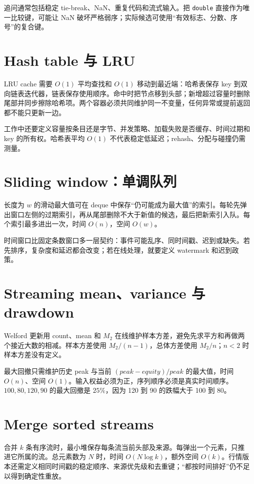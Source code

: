 追问通常包括稳定 tie-break、NaN、重复代码和流式输入。把 \texttt{double} 直接作为唯一比较键，可能让 NaN 破坏严格弱序；实际候选可使用“有效标志、分数、序号”的复合键。

\section{Hash table 与 LRU}

LRU cache 需要 \(O(1)\) 平均查找和 \(O(1)\) 移动到最近端：哈希表保存 key 到双向链表迭代器，链表保存使用顺序。命中时把节点移到头部；新增超过容量时删除尾部并同步擦除哈希项。两个容器必须共同维护同一不变量，任何异常或提前返回都不能只更新一边。

工作中还要定义容量按条目还是字节、并发策略、加载失败是否缓存、时间过期和 key 的所有权。哈希表平均 \(O(1)\) 不代表稳定低延迟；rehash、分配与碰撞仍需测量。

\section{Sliding window：单调队列}

长度为 \(w\) 的滑动最大值可在 deque 中保存“仍可能成为最大值”的索引。每轮先弹出窗口左侧的过期索引，再从尾部删除不大于新值的候选，最后把新索引入队。每个索引最多进出一次，时间 \(O(n)\)，空间 \(O(w)\)。

时间窗口比固定条数窗口多一层契约：事件可能乱序、同时间戳、迟到或缺失。若先排序，复杂度和延迟都会改变；若在线处理，就要定义 watermark 和迟到政策。

\section{Streaming mean、variance 与 drawdown}

Welford 更新用 count、mean 和 \(M_2\) 在线维护样本方差，避免先求平方和再做两个接近大数的相减。样本方差使用 \(M_2/(n-1)\)，总体方差使用 \(M_2/n\)；\(n<2\) 时样本方差没有定义。

最大回撤只需维护历史 peak 与当前 \((peak-equity)/peak\) 的最大值，时间 \(O(n)\)、空间 \(O(1)\)。输入权益必须为正，序列顺序必须是真实时间顺序。\(100,80,120,90\) 的最大回撤是 \(25\%\)，因为 120 到 90 的跌幅大于 100 到 80。

\section{Merge sorted streams}

合并 \(k\) 条有序流时，最小堆保存每条流当前头部及来源。每弹出一个元素，只推进它所属的流。总元素数为 \(N\) 时，时间 \(O(N\log k)\)，额外空间 \(O(k)\)。行情版本还需定义相同时间戳的稳定顺序、来源优先级和去重键；“都按时间排好”仍不足以得到确定性重放。

